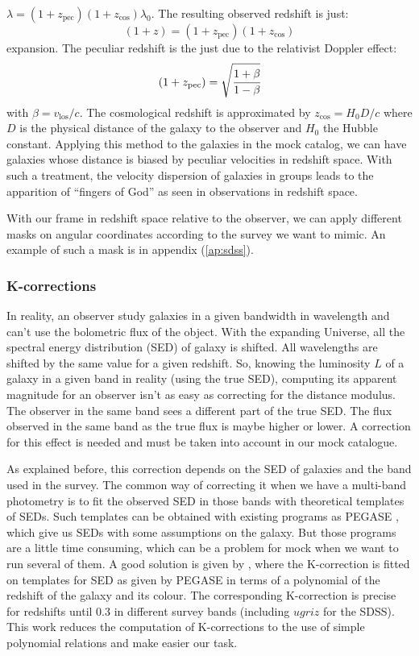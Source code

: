 $\lambda=(1+z_{\mathrm{pec}})(1+z_{\cos})\lambda_0$. The resulting
observed redshift is just:
%
\begin{equation}
    (1+z)=(1+z_{\mathrm{pec}})(1+z_{\cos})
\end{equation}
%
expansion. The peculiar redshift is the just due to the relativist Doppler
effect:
%
\begin{equation}
    (1+z_{\mathrm{pec}})=\sqrt{\cfrac{1+\beta}{1-\beta}}
\end{equation}
%
with $\beta={v_{\mathrm{los}}}/{c}$. The cosmological redshift is approximated
by $z_{\cos}={H_0}{D}/c$ where $D$ is the physical distance of the
galaxy to the observer and $H_0$ the Hubble constant. Applying this
method to the galaxies in the mock catalog, we can have galaxies whose distance
is biased by peculiar velocities in redshift space. With such a treatment, the
velocity dispersion of galaxies in groups leads to the apparition of ``fingers
of God'' as seen in observations in redshift space.

With our frame in redshift space relative to the observer, we can apply
different masks on angular coordinates according to the survey we want to
mimic. An example of such a mask is in appendix (\ref{ap:sdss}).
%
\subsubsection{K-corrections}
%
In reality, an observer study galaxies in a given bandwidth in wavelength and
can't use the bolometric flux of the object. With the expanding Universe, all
the spectral energy distribution (SED) of galaxy is shifted. All wavelengths
are shifted by the same value for a given redshift. So, knowing the luminosity
$L$ of a galaxy in a given band in reality (using the true SED), computing its
apparent magnitude for an observer isn't as easy as correcting for the distance
modulus. The observer in the same band sees a different part of the true SED\@.
The flux observed in the same band as the true flux is maybe higher or lower. A
correction for this effect is needed and must be taken into account in our mock
catalogue.

As explained before, this correction depends on the SED of galaxies and the
band used in the survey. The common way of correcting it when we have a
multi-band photometry is to fit the observed SED in those bands with
theoretical templates of SEDs. Such templates can be obtained with existing
programs as PEGASE , which give us SEDs with some
assumptions on the galaxy. But those programs are a little time consuming,
which can be a problem for mock when we want to run several of them. A good
solution is given by \citet{CMAZ10}, where the K-correction is fitted on
templates for SED as given by PEGASE in terms of a polynomial of the redshift
of the galaxy and its colour. The corresponding K-correction is precise for
redshifts until 0.3 in different survey bands (including $ugriz$ for the SDSS).
This work reduces the computation of K-corrections to the use of simple
polynomial relations and make easier our task.


